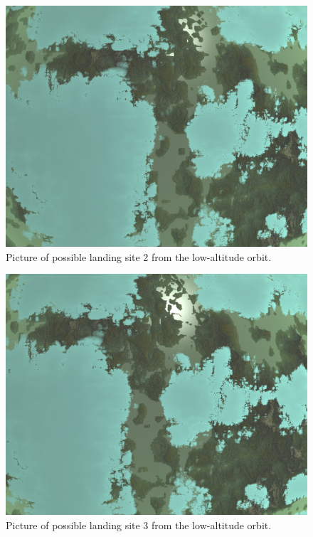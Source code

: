 \documentclass[reprint,english,notitlepage]{revtex4-2}
\begin{document}
    \begin{figure}[h]
        \centering
        \includegraphics[scale=0.14]{Figures/l_site2}
        \caption{Picture of possible landing site 2 from the low-altitude orbit.}\label{fig:l_site2}
    \end{figure}
    \begin{figure}[h]
        \centering
        \includegraphics[scale=0.14]{Figures/l_site3}
        \caption{Picture of possible landing site 3 from the low-altitude orbit.}\label{fig:l_site3}
    \end{figure}
\end{document}
